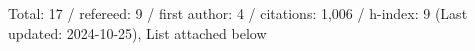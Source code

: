 Total: 17 / refereed: 9 / first author: 4 / citations: 1,006 / h-index: 9 (Last updated: 2024-10-25), List attached below